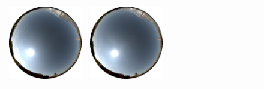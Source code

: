 \documentclass{report}
\begin{document}
\begin{figure}[!th]
\begin{tabular}{@{}rcccccccccccc@{}}
    \includegraphics[width=\customwidth]{./figures/database/20130824_110040.jpg} &
    \includegraphics[width=\customwidth]{./figures/database/20130824_113038.jpg} &

\end{tabular}
\end{figure}
\end{document}
